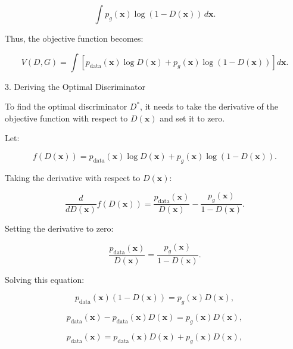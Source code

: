 \begin{equation}
    \int p_g(\mathbf{x}) \log (1 - D(\mathbf{x})) \, d\mathbf{x}.
\end{equation}

Thus, the objective function becomes:

\begin{equation}
    V(D, G) = \int \left[ p_{\text{data}}(\mathbf{x}) \log D(\mathbf{x}) + p_g(\mathbf{x}) \log (1 - D(\mathbf{x})) \right] d\mathbf{x}.
\end{equation}

3. Deriving the Optimal Discriminator

To find the optimal discriminator \( D^* \), it needs to take the derivative of the objective function with respect to \( D(\mathbf{x}) \) and set it to zero.

Let:

\begin{equation}
    f(D(\mathbf{x})) = p_{\text{data}}(\mathbf{x}) \log D(\mathbf{x}) + p_g(\mathbf{x}) \log (1 - D(\mathbf{x})).
\end{equation}

Taking the derivative with respect to \( D(\mathbf{x}) \):

\begin{equation}
    \frac{d}{dD(\mathbf{x})} f(D(\mathbf{x})) = \frac{p_{\text{data}}(\mathbf{x})}{D(\mathbf{x})} - \frac{p_g(\mathbf{x})}{1 - D(\mathbf{x})}.
\end{equation}

Setting the derivative to zero:

\begin{equation}
    \frac{p_{\text{data}}(\mathbf{x})}{D(\mathbf{x})} = \frac{p_g(\mathbf{x})}{1 - D(\mathbf{x})}.
\end{equation}

Solving this equation:

\begin{equation}
    p_{\text{data}}(\mathbf{x})(1 - D(\mathbf{x})) = p_g(\mathbf{x})D(\mathbf{x}),
\end{equation}

\begin{equation}
    p_{\text{data}}(\mathbf{x}) - p_{\text{data}}(\mathbf{x})D(\mathbf{x}) = p_g(\mathbf{x})D(\mathbf{x}),
\end{equation}

\begin{equation}
    p_{\text{data}}(\mathbf{x}) = p_{\text{data}}(\mathbf{x})D(\mathbf{x}) + p_g(\mathbf{x})D(\mathbf{x}),
\end{equation}

